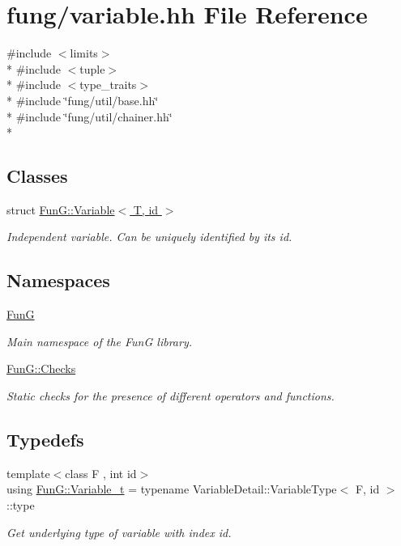 \hypertarget{variable_8hh}{}\section{fung/variable.hh File Reference}
\label{variable_8hh}
{\ttfamily \#include $<$limits$>$}\\*
{\ttfamily \#include $<$tuple$>$}\\*
{\ttfamily \#include $<$type\+\_\+traits$>$}\\*
{\ttfamily \#include \char`\"{}fung/util/base.\+hh\char`\"{}}\\*
{\ttfamily \#include \char`\"{}fung/util/chainer.\+hh\char`\"{}}\\*
\subsection*{Classes}
\begin{DoxyCompactItemize}
\item 
struct \hyperlink{structFunG_1_1Variable}{Fun\+G\+::\+Variable$<$ T, id $>$}
\begin{DoxyCompactList}\small\item\em Independent variable. Can be uniquely identified by its id. \end{DoxyCompactList}\end{DoxyCompactItemize}
\subsection*{Namespaces}
\begin{DoxyCompactItemize}
\item 
 \hyperlink{namespaceFunG}{Fun\+G}
\begin{DoxyCompactList}\small\item\em Main namespace of the Fun\+G library. \end{DoxyCompactList}\item 
 \hyperlink{namespaceFunG_1_1Checks}{Fun\+G\+::\+Checks}
\begin{DoxyCompactList}\small\item\em Static checks for the presence of different operators and functions. \end{DoxyCompactList}\end{DoxyCompactItemize}
\subsection*{Typedefs}
\begin{DoxyCompactItemize}
\item 
{\footnotesize template$<$class F , int id$>$ }\\using \hyperlink{namespaceFunG_a3d589ef7d011a46a72847eabcbbb4532}{Fun\+G\+::\+Variable\+\_\+t} = typename Variable\+Detail\+::\+Variable\+Type$<$ F, id $>$\+::type
\begin{DoxyCompactList}\small\item\em Get underlying type of variable with index id. \end{DoxyCompactList}\end{DoxyCompactItemize}
